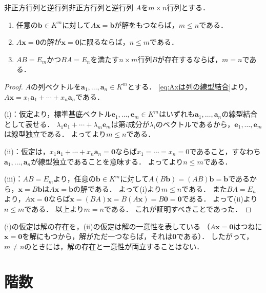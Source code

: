 \begin{prop}{非正方行列と逆行列}{非正方行列と逆行列}
  $A$を$m \times n$行列とする．
  \begin{enumerate}[label=(\roman*),leftmargin=3.2em]
    \item 任意の$\bm{b} \in K^m$に対して$A\bm{x} = \bm{b}$が解をもつならば，$m \le n$である．
    \item $A\bm{x} = \bm{0}$の解が$\bm{x} = \bm{0}$に限るならば，$n \le m$である．
    \item $AB = E_m$かつ$BA = E_n$を満たす$n \times m$行列$B$が存在するならば，$m = n$である．
  \end{enumerate}
\end{prop}

\begin{tleftbar}
\begin{proof}
  $A$の列ベクトルを$\bm{a}_1, \dots, \bm{a}_n \in K^m$とする．
  \eqref{eq:Axは列の線型結合}より，$A\bm{x} = x_1\bm{a}_1 + \cdots + x_n\bm{a}_n$である．

  (i)：仮定より，標準基底ベクトル$\bm{e}_1, \dots, \bm{e}_m \in K^m$はいずれも$\bm{a}_1, \dots, \bm{a}_n$の線型結合として表せる．
  $\lambda_1\bm{e}_1 + \cdots + \lambda_m\bm{e}_m$は第$i$成分が$\lambda_i$のベクトルであるから，$\bm{e}_1, \dots, \bm{e}_m$は線型独立である．
  よってより$m \le n$である．

  (ii)：仮定は，$x_1\bm{a}_1 + \cdots + x_n\bm{a}_n = \bm{0}$ならば$x_1 = \cdots = x_n = 0$であること，すなわち$\bm{a}_1, \dots, \bm{a}_n$が線型独立であることを意味する．
  よってより$n \le m$である．

  (iii)：$AB = E_m$より，任意の$\bm{b} \in K^m$に対して$A(B\bm{b}) = (AB)\bm{b} = \bm{b}$であるから，$\bm{x} = B\bm{b}$は$A\bm{x} = \bm{b}$の解である．
  よって(i)より$m \le n$である．
  また$BA = E_n$より，$A\bm{x} = \bm{0}$ならば$\bm{x} = (BA)\bm{x} = B(A\bm{x}) = B\bm{0} = \bm{0}$である．
  よって(ii)より$n \le m$である．
  以上より$m = n$である．
  これが証明すべきことであった．
\end{proof}
\end{tleftbar}

(i)の仮定は解の存在を，(ii)の仮定は解の一意性を表している
（$A\bm{x} = \bm{0}$はつねに$\bm{x} = \bm{0}$を解にもつから，解がただ一つならば，それは$\bm{0}$である）．
したがって，$m \ne n$のときには，解の存在と一意性が両立することはない．

\section{階数}

